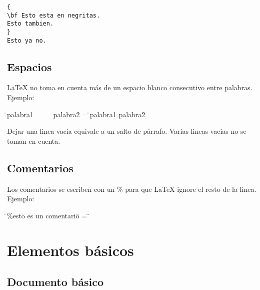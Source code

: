 \documentclass[12pt, a4paper,twoside]{article} %
\begin{document}
\begin{lstlisting}
{
\bf Esto esta en negritas.
Esto tambien.
}
Esto ya no.
\end{lstlisting}

\subsection{Espacios}

LaTeX no toma en cuenta más de un espacio blanco consecutivo entre palabras. Ejemplo:

\begin{center}
\"{}palabra1 \ \ \ \ \ palabra2\"{} = \"{}palabra1 palabra2\"{}
\end{center}

Dejar una linea vacía equivale a un salto de párrafo. Varias lineas vacias no se toman en cuenta.

\subsection{Comentarios}

Los comentarios se escriben con un \% para que LaTeX ignore el resto de la linea. Ejemplo:

\begin{center}
\"{}\%esto es un comentario\"{} = \"{}\"{}\ \ \ \ \ \ \ \ \ \ \ \ \ \
\end{center}

\section{Elementos básicos}

\subsection{Documento básico}
\end{document}
